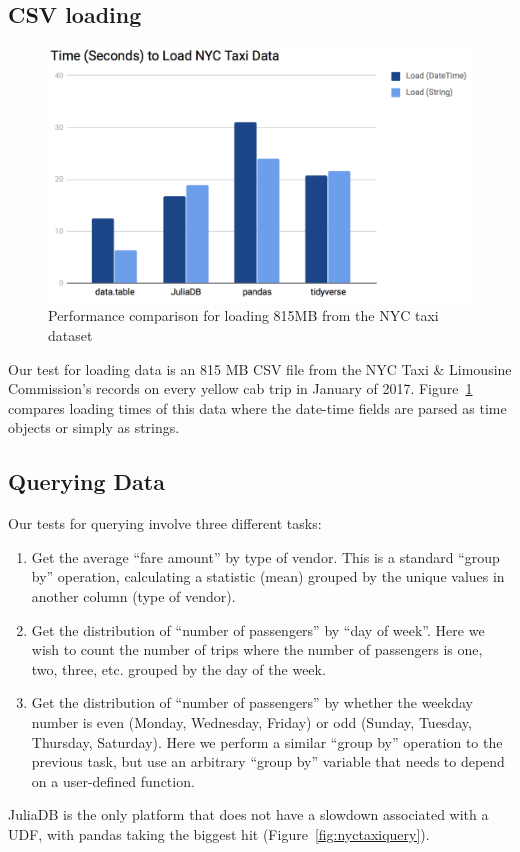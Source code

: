 \documentclass{juliacon}
\begin{document}
\subsection{CSV loading}

\begin{figure}[h]
\centering \includegraphics[width=5in]{image8.png} \caption{Performance comparison for loading 815MB from the NYC taxi dataset}
\label{fig:nyctaxiload} 
\end{figure}
Our test for loading data is an 815 MB CSV file from the NYC Taxi
\& Limousine Commission’s records on every yellow cab trip in January
of 2017. Figure~\ref{fig:nyctaxiload} compares loading times of
this data where the date-time fields are parsed as time objects or
simply as strings.

\subsection{Querying Data}

Our tests for querying involve three different tasks: 
\begin{enumerate}
\item Get the average “fare amount” by type of vendor. This is a standard
“group by” operation, calculating a statistic (mean) grouped by the
unique values in another column (type of vendor). 
\item Get the distribution of “number of passengers” by “day of week”. Here
we wish to count the number of trips where the number of passengers
is one, two, three, etc. grouped by the day of the week. 
\item Get the distribution of “number of passengers” by whether the weekday
number is even (Monday, Wednesday, Friday) or odd (Sunday, Tuesday,
Thursday, Saturday). Here we perform a similar “group by” operation
to the previous task, but use an arbitrary “group by” variable that
needs to depend on a user-defined function. 
\end{enumerate}
JuliaDB is the only platform that does not have a slowdown associated
with a UDF, with pandas taking the biggest hit (Figure~\ref{fig:nyctaxiquery}).
\end{document}
